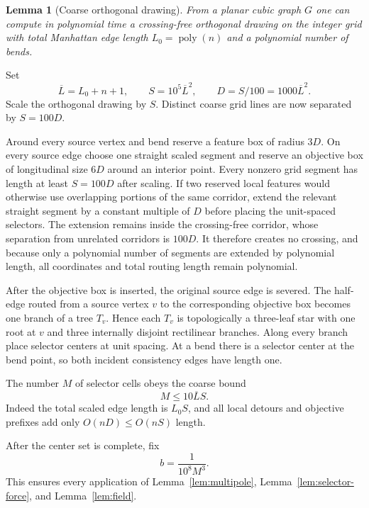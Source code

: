 \documentclass[12pt,a4paper]{article}
\newtheorem{lemma}[theorem]{Lemma}
\begin{document}
\begin{lemma}[Coarse orthogonal drawing]\label{lem:orthogonal}
From a planar cubic graph $G$ one can compute in polynomial time a crossing-free orthogonal drawing on the integer grid with total Manhattan edge length $L_0=\operatorname{poly}(n)$ and a polynomial number of bends.
\end{lemma}

Set
\begin{equation}\label{eq:Lbar}
 \overline L=L_0+n+1,
 \qquad
 S=10^5\overline L^2,
 \qquad
 D=S/100=1000\overline L^2.
\end{equation}
Scale the orthogonal drawing by $S$.  Distinct coarse grid lines are now separated by $S=100D$.

Around every source vertex and bend reserve a feature box of radius $3D$.  On every source edge choose one straight scaled segment and reserve an objective box of longitudinal size $6D$ around an interior point.  Every nonzero grid segment has length at least $S=100D$ after scaling.  If two reserved local features would otherwise use overlapping portions of the same corridor, extend the relevant straight segment by a constant multiple of $D$ before placing the unit-spaced selectors.  The extension remains inside the crossing-free corridor, whose separation from unrelated corridors is $100D$.  It therefore creates no crossing, and because only a polynomial number of segments are extended by polynomial length, all coordinates and total routing length remain polynomial.

After the objective box is inserted, the original source edge is severed.  The half-edge routed from a source vertex $v$ to the corresponding objective box becomes one branch of a tree $T_v$.  Hence each $T_v$ is topologically a three-leaf star with one root at $v$ and three internally disjoint rectilinear branches.  Along every branch place selector centers at unit spacing.  At a bend there is a selector center at the bend point, so both incident consistency edges have length one.

The number $M$ of selector cells obeys the coarse bound
\begin{equation}\label{eq:Mbound}
 M\le10\overline L S.
\end{equation}
Indeed the total scaled edge length is $L_0S$, and all local detours and objective prefixes add only $O(nD)\le O(nS)$ length.

After the center set is complete, fix
\begin{equation}\label{eq:b-final}
 \displaystyle b=\frac1{10^8M^3}.
\end{equation}
This ensures every application of Lemma~\ref{lem:multipole}, Lemma~\ref{lem:selector-force}, and Lemma~\ref{lem:field}.
\end{document}
